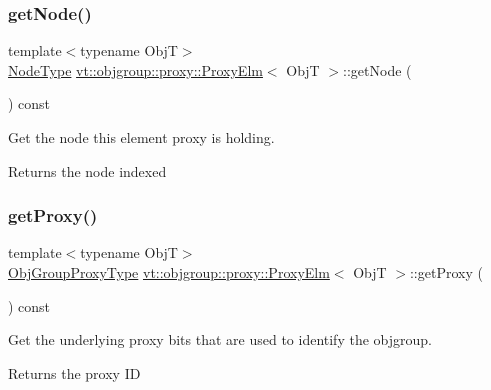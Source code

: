 \subsubsection{\texorpdfstring{get\+Node()}{getNode()}}
{\footnotesize\ttfamily template$<$typename ObjT$>$ \\
\hyperlink{namespacevt_a866da9d0efc19c0a1ce79e9e492f47e2}{Node\+Type} \hyperlink{structvt_1_1objgroup_1_1proxy_1_1_proxy_elm}{vt\+::objgroup\+::proxy\+::\+Proxy\+Elm}$<$ ObjT $>$\+::get\+Node (\begin{DoxyParamCaption}{ }\end{DoxyParamCaption}) const\hspace{0.3cm}{\ttfamily [inline]}}



Get the node this element proxy is holding. 

\begin{DoxyReturn}{Returns}
the node indexed 
\end{DoxyReturn}
\mbox{\label{structvt_1_1objgroup_1_1proxy_1_1_proxy_elm_ae7cbfe997421f265fa51cd29adc6957e}} 
\subsubsection{\texorpdfstring{get\+Proxy()}{getProxy()}}
{\footnotesize\ttfamily template$<$typename ObjT$>$ \\
\hyperlink{namespacevt_ad7cae989df485fccca57f0792a880a8e}{Obj\+Group\+Proxy\+Type} \hyperlink{structvt_1_1objgroup_1_1proxy_1_1_proxy_elm}{vt\+::objgroup\+::proxy\+::\+Proxy\+Elm}$<$ ObjT $>$\+::get\+Proxy (\begin{DoxyParamCaption}{ }\end{DoxyParamCaption}) const\hspace{0.3cm}{\ttfamily [inline]}}



Get the underlying proxy bits that are used to identify the objgroup. 

\begin{DoxyReturn}{Returns}
the proxy ID 
\end{DoxyReturn}
\mbox{\label{structvt_1_1objgroup_1_1proxy_1_1_proxy_elm_a02cc360f62de45c52d97a69c464054cb}} 
